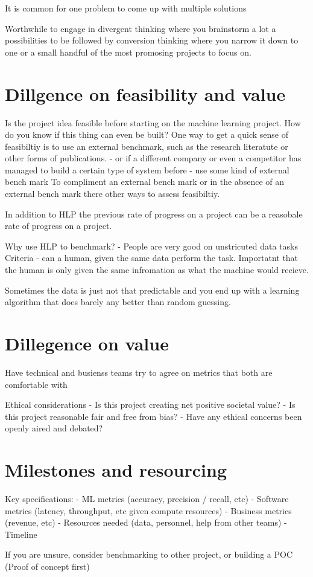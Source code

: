 It is common for one problem to come up with multiple solutions

Worthwhile to engage in divergent thinking where you brainstorm a lot a possibilities to be followed by conversion thinking where you narrow it down to one or a small handful of the most promosing projects to focus on.

\section{Dillgence on feasibility and value}

Is the project idea feasible before starting on the machine learning project.
How do you know if this thing can even be built?
One way to get a quick sense of feasibiltiy is to use an external benchmark, such as the research literatute or other forms of publications.
- or if a different company or even a competitor has managed to build a certain type of system before
- use some kind of external bench mark
To compliment an external bench mark or in the absence of an external bench mark there other ways to assess feasibiltiy.


In addition to HLP the previous rate of progress on a project can be a reasobale rate of progress on a project.

Why use HLP to benchmark?
- People are very good on unstricuted data tasks
Criteria - can a human, given the same data perform the task.
Importatnt that the human is only given the same infromation as what the machine would recieve.

Sometimes the data is just not that predictable and you end up with a learning algorithm that does barely any better than random guessing.




\section{Dillegence on value}

Have technical and busienss teams try to agree on metrics that both are comfortable with

Ethical considerations
- Is this project creating net positive societal value?
- Is this project reasonable fair and free from bias?
- Have any ethical concerns been openly aired and debated?

\section{Milestones and resourcing}

Key specifications:
- ML metrics (accuracy, precision / recall, etc)
- Software metrics (latency, throughput, etc given compute resources)
- Business metrics (revenue, etc)
- Resources needed (data, personnel, help from other teams)
- Timeline

If you are unsure, consider benchmarking to other project, or building a POC (Proof of concept first)
